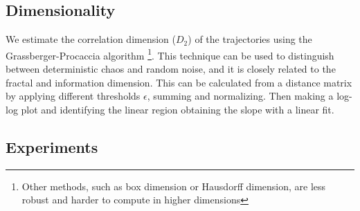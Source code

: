 \documentclass[a4paper,12pt]{article}
\begin{document}

\subsection{Dimensionality}
\label{subsec:dimensionality_results}
We estimate the correlation dimension ($D_2$) of the trajectories using the Grassberger-Procaccia algorithm \cite{GRASSBERGER1983189} \footnote{Other methods, such as box dimension or Hausdorff dimension, are less robust and harder to compute in higher dimensions}. This technique can be used to distinguish between deterministic chaos and random noise, and it is closely related to the fractal and information dimension. This can be calculated from a distance matrix by applying different thresholds $\epsilon$, summing and normalizing. Then making a log-log plot and identifying the linear region obtaining the slope with a linear fit.





\subsection{Experiments}
\label{subsec:experiments}
\end{document}
